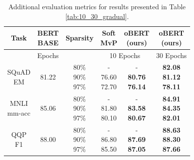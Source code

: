 \documentclass[11pt]{article}
\begin{document}
\begin{table}[htb!]
\setlength{\tabcolsep}{4pt}
    \centering
    {\small 
    \begin{tabular}{ccc|cc|c}
    \toprule 
    Task & \makecell{BERT\\\small{BASE}} & Sparsity & \makecell{Soft\\MvP} & \makecell{oBERT\\(ours)} & \makecell{oBERT\\(ours)}\\
    \midrule
      & Epochs && \multicolumn{2}{c|}{10 Epochs} & 30 Epochs\\                       
    \midrule
    \makecell{SQuAD\\EM} & 81.22 & \makecell{80\% \\ 90\% \\ 97\%} & \makecell{- \\ 76.60 \\ 72.70} &  \makecell{- \\ \textbf{80.76} \\ \textbf{76.14}} & \makecell{\textbf{82.08} \\ \textbf{81.12} \\ \textbf{78.11}}\\
    \midrule
    \makecell{MNLI\\mm-acc} & 85.06 & \makecell{80\% \\ 90\% \\ 97\%} & \makecell{- \\ 81.80 \\ 80.10} & \makecell{- \\ \textbf{83.58} \\ \textbf{80.67}} &  \makecell{\textbf{84.91} \\ \textbf{84.35} \\ \textbf{82.01}}\\
    \midrule
    \makecell{QQP\\F1} & 88.00 &  \makecell{80\% \\ 90\% \\ 97\%} & \makecell{- \\ 86.80 \\ 85.50} & \makecell{- \\ \textbf{87.69} \\ \textbf{87.05}} & \makecell{\textbf{88.63} \\ \textbf{88.30} \\ \textbf{87.66}}\\
    \bottomrule
    \end{tabular}
    }
    \caption{Additional evaluation metrics for results presented in Table \ref{tab:10_30_gradual}.}
    \label{tab:10_30_gradual_v2}
\end{table}
\end{document}
